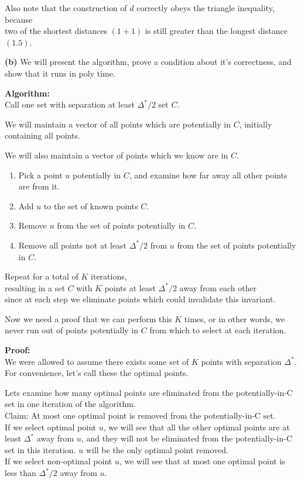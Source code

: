 \documentclass[11pt]{article}
\renewcommand{\part}[1] {\vspace{.10in} {\bf (#1)}}
\begin{document}
Also note that the construction of $d$ correctly obeys the triangle inequality, because\\
two of the shortest distances $(1 + 1)$ is still greater than the longest distance $(1.5)$.


\part{b}
We will present the algorithm, prove a condition about it's correctness, and show that it runs in poly time.

\textbf{Algorithm:}\\
Call one set with separation at least $\Delta^{*} / 2$ set $C$.

We will maintain a vector of all points which are potentially in $C$, initially containing all points.

We will also maintain a vector of points which we know are in $C$.

\begin{enumerate}
\item Pick a point $u$ potentially in $C$, and examine how far away all other points are from it.
\item Add $u$ to the set of known points $C$.
\item Remove $u$ from the set of points potentially in $C$.
\item Remove all points not at least $\Delta^{*} / 2$ from $u$ from the set of points potentially in $C$.
\end{enumerate}

Repeat for a total of $K$ iterations,\\
resulting in a set $C$ with $K$ points at least $\Delta^{*} / 2$ away from each other\\
since at each step we eliminate points which could invalidate this invariant.

Now we need a proof that we can perform this $K$ times, or in other words, we never run out of points potentially in $C$ from which to select at each iteration.

\textbf{Proof:}\\
We were allowed to assume there exists some set of $K$ points with separation $\Delta^{*}$.\\
For convenience, let's call these the optimal points.

Lets examine how many optimal points are eliminated from the potentially-in-C set in one iteration of the algorithm.\\
Claim: At most one optimal point is removed from the potentially-in-C set.\\
If we select optimal point $u$, we will see that all the other optimal points are at least $\Delta^{*}$ away from $u$, and they will not be eliminated from the potentially-in-C set in this iteration. $u$ will be the only optimal point removed.\\
If we select non-optimal point $u$, we will see that at most one optimal point is less than $\Delta^{*} / 2$ away from $u$.
\end{document}
